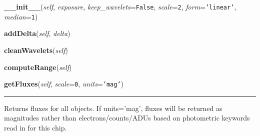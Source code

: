     \begin{boxedminipage}{\textwidth}

    \raggedright \textbf{\_\_init\_\_}(\textit{self}, \textit{exposure}, \textit{keep\_wavelets}=\texttt{F\-a\-l\-s\-e\-}, \textit{scale}=\texttt{2\-}, \textit{form}=\texttt{'\-l\-i\-n\-e\-a\-r\-'\-}, \textit{median}=\texttt{1\-})

    \end{boxedminipage}

    \label{multireg:chipwavelets:Chip:addDelta}
    \vspace{0.5ex}

    \begin{boxedminipage}{\textwidth}

    \raggedright \textbf{addDelta}(\textit{self}, \textit{delta})

    \end{boxedminipage}

    \label{multireg:chipwavelets:Chip:cleanWavelets}
    \vspace{0.5ex}

    \begin{boxedminipage}{\textwidth}

    \raggedright \textbf{cleanWavelets}(\textit{self})

    \end{boxedminipage}

    \label{multireg:chipwavelets:Chip:computeRange}
    \vspace{0.5ex}

    \begin{boxedminipage}{\textwidth}

    \raggedright \textbf{computeRange}(\textit{self})

    \end{boxedminipage}

    \label{multireg:chipwavelets:Chip:getFluxes}
    \vspace{0.5ex}

    \begin{boxedminipage}{\textwidth}

    \raggedright \textbf{getFluxes}(\textit{self}, \textit{scale}=\texttt{0\-}, \textit{units}=\texttt{'\-m\-a\-g\-'\-})

    \vspace{-1.5ex}

    \rule{\textwidth}{0.5\fboxrule}
    Returns fluxes for all objects. If units='mag', fluxes will be 
    returned as magnitudes rather than electrons/counts/ADUs based on 
    photometric keywords read in for this chip.

    \vspace{1ex}

    \end{boxedminipage}

